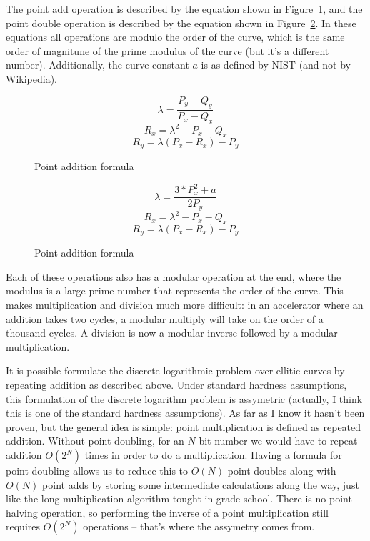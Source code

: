 \documentclass[twocolumn]{article}
\begin{document}
The point add operation is described by the equation shown in
Figure~\ref{point-add-eq}, and the point double operation is described
by the equation shown in Figure~\ref{point-dub-eq}.  In these
equations all operations are modulo the order of the curve, which is
the same order of magnitune of the prime modulus of the curve (but
it's a different number).  Additionally, the curve constant $a$ is as
defined by NIST (and not by Wikipedia).

\begin{figure}[ht]
  $$ \lambda = \frac{P_y - Q_y}{P_x - Q_x} $$
  $$ R_x = \lambda^2 - P_x - Q_x $$
  $$ R_y = \lambda(P_x - R_x) - P_y $$

  \caption{Point addition formula
    \label{point-add-eq}}
\end{figure}

\begin{figure}[ht]
  $$ \lambda = \frac{3 * P_x^2 + a}{2P_y} $$
  $$ R_x = \lambda^2 - P_x - Q_x $$
  $$ R_y = \lambda(P_x - R_x) - P_y $$

  \caption{Point addition formula
    \label{point-dub-eq}}
\end{figure}

Each of these operations also has a modular operation at the end,
where the modulus is a large prime number that represents the order of
the curve. This makes multiplication and division much more difficult:
in an accelerator where an addition takes two cycles, a modular
multiply will take on the order of a thousand cycles\cite{kss-ecdsa}.
A division is now a modular inverse followed by a modular
multiplication.

It is possible formulate the discrete logarithmic problem over
ellitic curves by repeating addition as described above.  Under
standard hardness assumptions, this formulation of the discrete
logarithm problem is assymetric (actually, I think this is one of the
standard hardness assumptions).  As far as I know it hasn't been
proven, but the general idea is simple: point multiplication is
defined as repeated addition.  Without point doubling, for an $N$-bit
number we would have to repeat addition $O(2^N)$ times in order to do
a multiplication.  Having a formula for point doubling allows us to
reduce this to $O(N)$ point doubles along with $O(N)$ point adds by
storing some intermediate calculations along the way, just like the
long multiplication algorithm tought in grade school.  There is no
point-halving operation, so performing the inverse of a point
multiplication still requires $O(2^N)$ operations -- that's where the
assymetry comes from.
\end{document}
